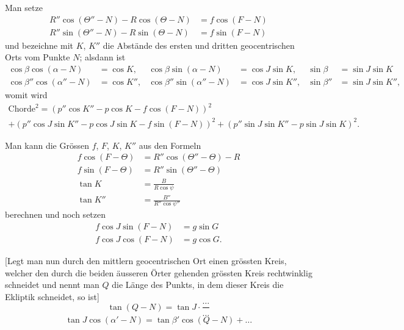 \documentclass[12pt,a4paper]{article}
\begin{document}
Man setze
\begin{align*}
R''\cos(\Theta'' - N) - R\cos(\Theta - N) &= f\cos(F - N) \\
R''\sin(\Theta'' - N) - R\sin(\Theta - N) &= f\sin(F - N)
\end{align*}
und bezeichne mit $K$, $K''$ die Abst\"ande des ersten und dritten geocentrischen
Orts vom Punkte $N$; alsdann ist
\begin{align*}
\cos\beta\cos(\alpha - N) &= \cos K, & \cos\beta\sin(\alpha - N) &= \cos J\sin K, & \sin\beta &= \sin J\sin K \\
\cos\beta''\cos(\alpha'' - N) &= \cos K'', & \cos\beta''\sin(\alpha'' - N) &= \cos J\sin K'', & \sin\beta'' &= \sin J\sin K'',
\end{align*}
womit wird
\begin{multline*}
\text{Chorde}^2 = (p''\cos K'' - p\cos K - f\cos(F - N))^2 \\
+ (p''\cos J\sin K'' - p\cos J\sin K - f\sin(F - N))^2 + (p''\sin J\sin K'' - p\sin J\sin K)^2.
\end{multline*}

Man kann die Gr\"ossen $f$, $F$, $K$, $K''$ aus den Formeln
\begin{align*}
f\cos(F - \Theta) &= R''\cos(\Theta'' - \Theta) - R \\
f\sin(F - \Theta) &= R''\sin(\Theta'' - \Theta) \\
\tan K &= \frac{B}{R\cos\psi} \\
\tan K'' &= \frac{B''}{R''\cos\psi''}
\end{align*}
berechnen und noch setzen
\begin{align*}
f\cos J\sin(F - N) &= g\sin G \\
f\cos J\cos(F - N) &= g\cos G.
\end{align*}

\newpage

[Legt man nun durch den mittlern geocentrischen Ort einen gr\"ossten
Kreis, welcher den durch die beiden \"ausseren \"Orter gehenden gr\"ossten Kreis
rechtwinklig schneidet und nennt man $Q$ die L\"ange des Punkts, in dem
dieser Kreis die Ekliptik schneidet, so ist]
\begin{equation}\tag{VI}
\tan(Q - N) = \tan J \cdot \frac{\ldots}{\ldots}
\end{equation}
\begin{equation}
\tan J \cos(\alpha' - N) = \tan\beta' \cos(Q - N) + \ldots
\end{equation}
\end{document}
